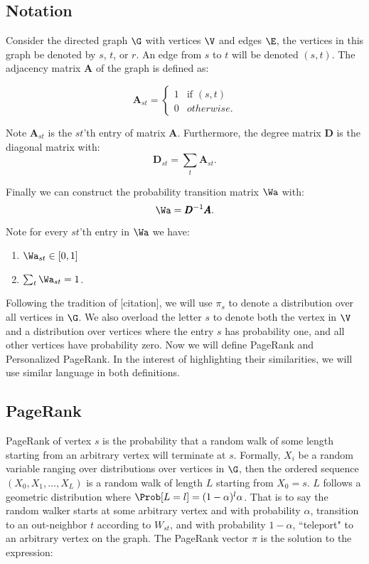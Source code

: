 \subsection{Notation}

Consider the directed graph $\G$ with vertices $\V$ and edges $\E$, the vertices in this graph be denoted by $s$, $t$, or $r$. An edge from $s$ to $t$ will be denoted $(s,t)$. The adjacency matrix $\pmb{A}$ of the graph is defined as:

\[   
\pmb{A}_{st} = \left\{
\begin{array}{ll}
      1 & \text{if } (s,t) \\
      0 & otherwise.
\end{array} 
\right. 
\]

Note $\pmb{A}_{st}$ is the $st$'th entry of matrix $\pmb{A}$. Furthermore, the degree matrix $\pmb{D}$ is the diagonal matrix with:
	\[
		\pmb{D}_{st} = \sum_{t} \pmb{A}_{st}.
	\]


Finally we can construct the probability transition matrix $\Wa$ with:
	\[
		\Wa = \pmb{D}^{-1} \pmb{A}.
	\]

Note for every $st$'th entry in $\Wa$ we have:

\begin{enumerate}
	\item $\Wa_{st} \in [0,1]$
	\item $\sum_t \Wa_{st} = 1$.
\end{enumerate}

Following the tradition of [citation], we will use $\pi_s$ to denote a distribution over all vertices in $\G$. We also overload the letter $s$ to denote both the vertex in $\V$ and a distribution over vertices where the entry $s$ has probability one, and all other vertices have probability zero. Now we will define PageRank and Personalized PageRank. In the interest of highlighting their similarities, we will use similar language in both definitions. 

\subsection{PageRank}

PageRank of vertex $s$ is the probability that a random walk of some length starting from an arbitrary vertex will terminate at $s$. Formally, $X_i$ be a random variable ranging over distributions over vertices in $\G$, then the ordered sequence $(X_0, X_1,\ldots,X_L)$ is a random walk of length $L$ starting from $X_0 = s$. $L$ follows a geometric distribution where $\Prob[L = l] = (1 - \alpha)^l \alpha$. That is to say the random walker starts at some arbitrary vertex and with probability $\alpha$, transition to an out-neighbor $t$ according to $W_{st}$, and with probability $1 - \alpha$, ``teleport" to an arbitrary vertex on the graph. The PageRank vector $\pi$ is the solution to the expression:

